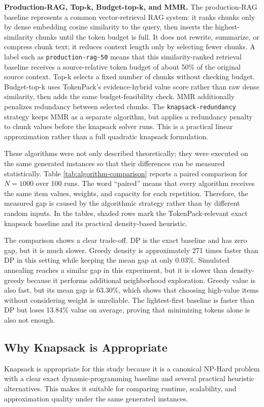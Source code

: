 \documentclass[conference]{IEEEtran}
\begin{document}
\textbf{Production-RAG, Top-k, Budget-top-k, and MMR.} The production-RAG baseline represents a common vector-retrieval RAG system: it ranks chunks only by dense embedding cosine similarity to the query, then inserts the highest-similarity chunks until the token budget is full. It does not rewrite, summarize, or compress chunk text; it reduces context length only by selecting fewer chunks. A label such as \texttt{production-rag-50} means that this similarity-ranked retrieval baseline receives a source-relative token budget of about 50\% of the original source context. Top-k selects a fixed number of chunks without checking budget. Budget-top-k uses TokenPack's evidence-hybrid value score rather than raw dense similarity, then adds the same budget-feasibility check. MMR additionally penalizes redundancy between selected chunks. The \texttt{knapsack-redundancy} strategy keeps MMR as a separate algorithm, but applies a redundancy penalty to chunk values before the knapsack solver runs. This is a practical linear approximation rather than a full quadratic knapsack formulation.

These algorithms were not only described theoretically; they were executed on the same generated instances so that their differences can be measured statistically. Table \ref{tab:algorithm-comparison} reports a paired comparison for $N=1000$ over 100 runs. The word ``paired'' means that every algorithm receives the same item values, weights, and capacity for each repetition. Therefore, the measured gap is caused by the algorithmic strategy rather than by different random inputs. In the tables, shaded rows mark the TokenPack-relevant exact knapsack baseline and its practical density-based heuristic.



The comparison shows a clear trade-off. DP is the exact baseline and has zero gap, but it is much slower. Greedy density is approximately 271 times faster than DP in this setting while keeping the mean gap at only 0.03\%. Simulated annealing reaches a similar gap in this experiment, but it is slower than density-greedy because it performs additional neighborhood exploration. Greedy value is also fast, but its mean gap is 63.30\%, which shows that choosing high-value items without considering weight is unreliable. The lightest-first baseline is faster than DP but loses 13.84\% value on average, proving that minimizing tokens alone is also not enough.
\FloatBarrier

\subsection{Why Knapsack is Appropriate}
Knapsack is appropriate for this study because it is a canonical NP-Hard problem with a clear exact dynamic-programming baseline and several practical heuristic alternatives. This makes it suitable for comparing runtime, scalability, and approximation quality under the same generated instances.
\end{document}
